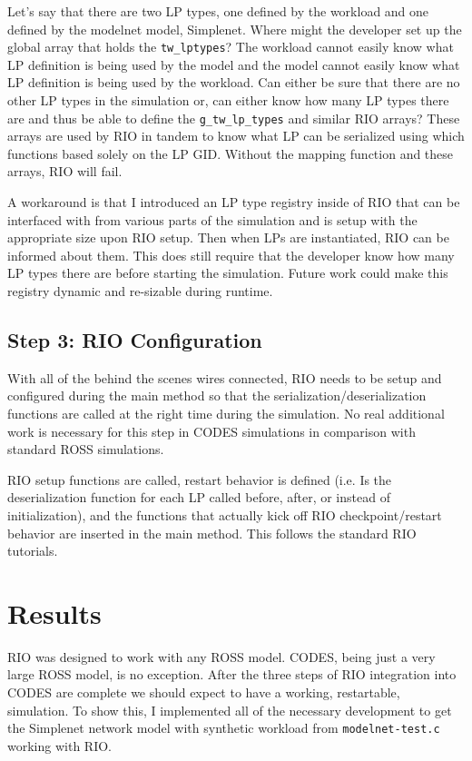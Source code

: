 \documentclass[letterpaper, 11 pt, conference]{IEEEtran}
\begin{document}
Let's say that there are two LP types, one defined by the workload and one defined by the modelnet model, Simplenet. Where might the developer set up the global array that holds the \texttt{tw\_lptypes}? The workload cannot easily know what LP definition is being used by the model and the model cannot easily know what LP definition is being used by the workload. Can either be sure that there are no other LP types in the simulation or, can either know how many LP types there are and thus be able to define the \texttt{g\_tw\_lp\_types} and similar RIO arrays? These arrays are used by RIO in tandem to know what LP can be serialized using which functions based solely on the LP GID. Without the mapping function and these arrays, RIO will fail.

A workaround is that I introduced an LP type registry inside of RIO that can be interfaced with from various parts of the simulation and is setup with the appropriate size upon RIO setup. Then when LPs are instantiated, RIO can be informed about them. This does still require that the developer know how many LP types there are before starting the simulation. Future work could make this registry dynamic and re-sizable during runtime.

\subsection{Step 3: RIO Configuration}
With all of the behind the scenes wires connected, RIO needs to be setup and configured during the main method so that the serialization/deserialization functions are called at the right time during the simulation. No real additional work is necessary for this step in CODES simulations in comparison with standard ROSS simulations.

RIO setup functions are called, restart behavior is defined (i.e. Is the deserialization function for each LP called before, after, or instead of initialization), and the functions that actually kick off RIO checkpoint/restart behavior are inserted in the main method. This follows the standard RIO tutorials.

\section{Results}

RIO was designed to work with any ROSS model. CODES, being just a very large ROSS model, is no exception. After the three steps of RIO integration into CODES are complete we should expect to have a working, restartable, simulation. To show this, I implemented all of the necessary development to get the Simplenet network model with synthetic workload from \texttt{modelnet-test.c} working with RIO.
\end{document}
